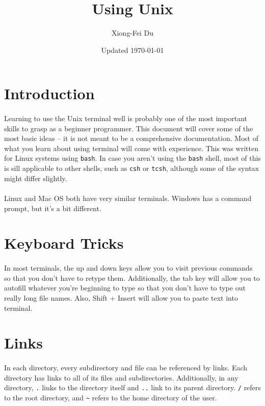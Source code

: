 \documentclass{article}
\title{Using Unix}
\author{Xiong-Fei Du}
\date{Updated \today}
\begin{document}
\maketitle

\section{Introduction}

\paragraph{} Learning to use the Unix terminal well is probably one of the most important skills to grasp as a beginner programmer. This document will cover some of the most basic ideas -- it is not meant to be a comprehensive documentation. Most of what you learn about using terminal will come with experience. This was written for Linux systems using \texttt{bash}. In case you aren't using the \texttt{bash} shell, most of this is sill applicable to other shells, such as \texttt{csh} or \texttt{tcsh}, although some of the syntax might differ slightly.

\paragraph{} Linux and Mac OS both have very similar terminals. Windows has a command prompt, but it's a bit different.

\section{Keyboard Tricks}

\paragraph{} In most terminals, the up and down keys allow you to visit previous commands so that you don't have to retype them. Additionally, the tab key will allow you to autofill whatever you're beginning to type so that you don't have to type out really long file names. Also, Shift + Insert will allow you to paste text into terminal.

\section{Links}

\paragraph{} In each directory, every subdirectory and file can be referenced by links. Each directory has links to all of its files and subdirectories. Additionally, in any directory, \texttt{.} links to the directory itself and \texttt{..} link to its parent directory. \texttt{/} refers to the root directory, and \texttt{\~} refers to the home directory of the user.
\end{document}
